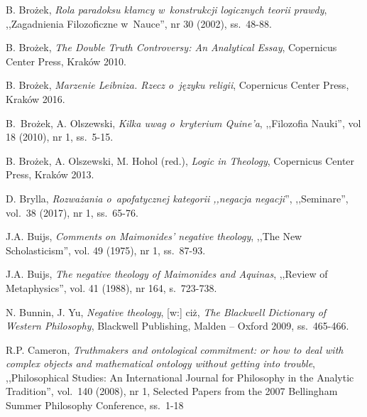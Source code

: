 \begin{thebibliography}{100}

B. Brożek, \textit{Rola paradoksu kłamcy w~konstrukcji logicznych teorii prawdy}, ,,Zagadnienia Filozoficzne w~Nauce'', nr 30 (2002), ss.~48-88.

B. Brożek, \textit{The Double Truth Controversy: An Analytical Essay}, Copernicus Center Press, Kraków 2010.

B. Brożek, \textit{Marzenie Leibniza. Rzecz o~języku religii}, Copernicus Center Press, Kraków 2016.

B.~Brożek, A. Olszewski, \textit{Kilka uwag o~kryterium Quine'a}, ,,Filozofia Nauki'', vol 18 (2010), nr 1, ss.~5-15.

B. Brożek, A. Olszewski, M. Hohol (red.), \textit{Logic in Theology}, Copernicus Center Press, Kraków 2013.

D. Brylla, \textit{Rozważania o~apofatycznej kategorii ,,negacja negacji}'', ,,Seminare'', vol.~38 (2017), nr 1, ss.~65-76.


J.A. Buijs, \textit{Comments on Maimonides' negative theology}, ,,The New Scholasticism'', vol. 49 (1975), nr 1, ss.~87-93.

J.A. Buijs, \textit{The negative theology of Maimonides and Aquinas}, ,,Review of Metaphysics'', vol. 41 (1988), nr 164, s.~723-738.


N. Bunnin, J. Yu, \textit{Negative theology}, [w:] ciż, \textit{The Blackwell Dictionary of Western Philosophy}, Blackwell Publishing, Malden -- Oxford 2009, ss.~465-466.


R.P. Cameron, \textit{Truthmakers and ontological commitment: or how to deal with complex objects and mathematical ontology without getting into trouble},
,,Philosophical Studies: An International Journal for Philosophy in the Analytic Tradition'', vol.~140 (2008), nr 1, Selected Papers from the 2007 Bellingham Summer Philosophy Conference, ss.~1-18


\end{thebibliography}
